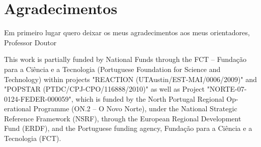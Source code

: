\chapter*{Agradecimentos}

Em primeiro lugar quero deixar os meus agradecimentos aos meus orientadores, Professor Doutor 


\vspace{10mm}

\vfill

This work is partially funded by National Funds through the FCT – Fundação para a Ciência e a Tecnologia (Portuguese Foundation for Science and Technology) within projects "REACTION (UTAustin/EST-MAI/0006/2009)" and "POPSTAR (PTDC/CPJ-CPO/116888/2010)" as well as Project "NORTE-07-0124-FEDER-000059", which is funded by the North Portugal Regional Op- erational Programme (ON.2 – O Novo Norte), under the National Strategic Reference Framework (NSRF), through the European Regional Development Fund (ERDF), and the Portuguese funding agency, Fundação para a Ciência e a Tecnologia (FCT). 